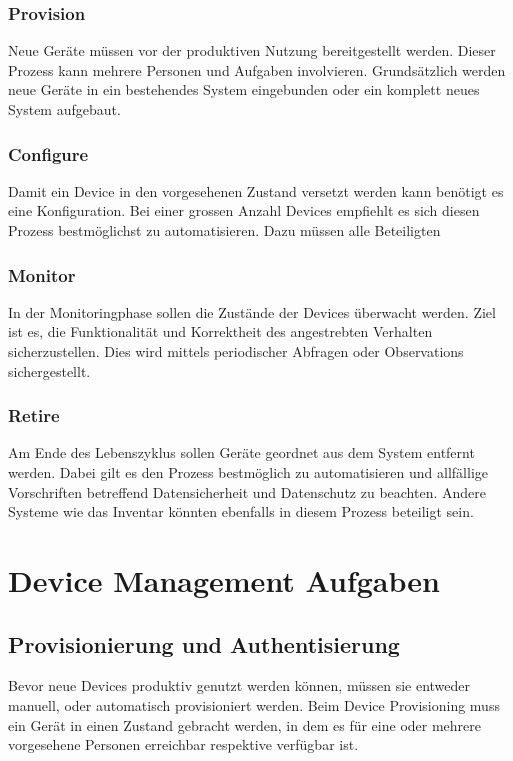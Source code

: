 \subsubsection{Provision}
Neue Geräte müssen vor der produktiven Nutzung bereitgestellt werden. Dieser Prozess kann mehrere Personen und Aufgaben involvieren. Grundsätzlich werden neue Geräte in ein bestehendes System eingebunden oder ein komplett neues System aufgebaut.
\subsubsection{Configure}
Damit ein Device in den vorgesehenen Zustand versetzt werden kann benötigt es eine Konfiguration. Bei einer grossen Anzahl Devices empfiehlt es sich diesen Prozess bestmöglichst zu automatisieren. Dazu müssen alle Beteiligten  
\subsubsection{Monitor}
In der Monitoringphase sollen die Zustände der Devices überwacht werden. Ziel ist es, die Funktionalität und Korrektheit des angestrebten Verhalten sicherzustellen. Dies wird mittels periodischer Abfragen oder Observations sichergestellt. 
\subsubsection{Retire}
Am Ende des Lebenszyklus sollen Geräte geordnet aus dem System entfernt werden. Dabei gilt es den Prozess bestmöglich zu automatisieren und allfällige Vorschriften betreffend Datensicherheit und Datenschutz zu beachten. Andere Systeme wie das Inventar könnten ebenfalls in diesem Prozess beteiligt sein.
\section{Device Management Aufgaben}
\subsection{Provisionierung und Authentisierung}
Bevor neue Devices produktiv genutzt werden können, müssen sie entweder manuell, oder automatisch provisioniert werden. Beim Device Provisioning muss ein Gerät in einen Zustand gebracht werden, in dem es für eine oder mehrere vorgesehene Personen erreichbar respektive verfügbar ist.

